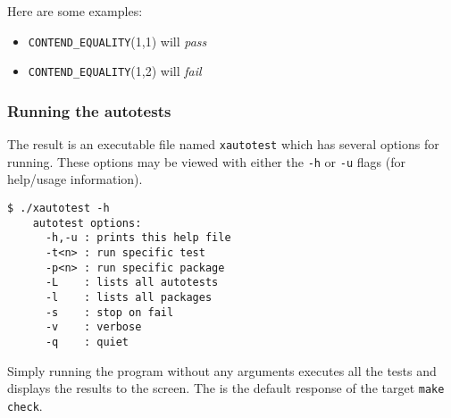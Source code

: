 Here are some examples:
\begin{itemize}
\item[] {\tt CONTEND\_EQUALITY}(1,1) will {\it pass}
\item[] {\tt CONTEND\_EQUALITY}(1,2) will {\it fail}
\end{itemize}

\subsubsection{Running the autotests}
The result is an executable file named {\tt xautotest} which has several
options for running.
These options may be viewed with either the {\tt -h} or {\tt -u} flags (for
help/usage information).
%
\begin{Verbatim}[fontsize=\small]
    $ ./xautotest -h
    autotest options:
      -h,-u : prints this help file
      -t<n> : run specific test
      -p<n> : run specific package
      -L    : lists all autotests
      -l    : lists all packages
      -s    : stop on fail
      -v    : verbose
      -q    : quiet
\end{Verbatim}
%
Simply running the program without any arguments executes all the tests and
displays the results to the screen.
The is the default response of the target {\tt make check}.

